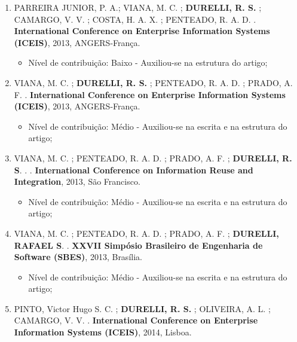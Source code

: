 \begin{itemize}
\begin{enumerate}
	 	\item PARREIRA JUNIOR, P. A.; VIANA, M. C. ; \textbf{DURELLI, R. S.} ; CAMARGO, V. V. ; COSTA, H. A. X. ; PENTEADO, R. A. D. . \textbf{International Conference on Enterprise Information Systems (ICEIS)}, 2013, ANGERS-França.
	 	
	 	    \begin{itemize}
			    \item Nível de contribuição: Baixo - Auxiliou-se na estrutura do artigo;
			    \end{itemize}
		
		\item VIANA, M. C. ; \textbf{DURELLI, R. S.} ; PENTEADO, R. A. D. ; PRADO, A. F. . \textbf{International Conference on Enterprise Information Systems (ICEIS)}, 2013, ANGERS-França.
		    
		    \begin{itemize}
			    \item Nível de contribuição: Médio - Auxiliou-se na escrita e na estrutura do artigo;
			    \end{itemize}
		
		\item VIANA, M. C. ; PENTEADO, R. A. D. ; PRADO, A. F. ; \textbf{DURELLI, R. S}. . . \textbf{International Conference on Information Reuse and Integration}, 2013, São Francisco.
		        \begin{itemize}
			    \item Nível de contribuição: Médio - Auxiliou-se na escrita e na estrutura do artigo;
			    \end{itemize}
		
		\item VIANA, M. C. ; PENTEADO, R. A. D. ; PRADO, A. F. ; \textbf{DURELLI, RAFAEL S}. . \textbf{XXVII Simpósio Brasileiro de Engenharia de Software (SBES)}, 2013, Brasília.
		    \begin{itemize}
			    \item Nível de contribuição: Médio - Auxiliou-se na escrita e na estrutura do artigo;
			    \end{itemize}
		
		\item PINTO, Victor Hugo S. C. ; \textbf{DURELLI, R. S.} ; OLIVEIRA, A. L. ; CAMARGO, V. V. . \textbf{International Conference on Enterprise Information Systems (ICEIS)}, 2014, Lisboa.
		

\end{enumerate}
\end{itemize}
